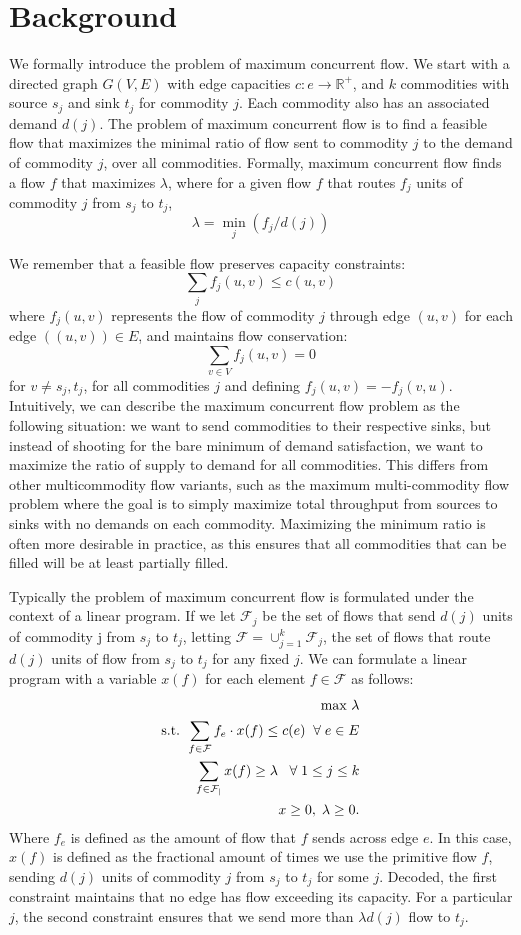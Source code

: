 \section{Background}
We formally introduce the problem of maximum concurrent flow. We
start with a directed graph $G(V,E)$ with edge capacities 
$c: e \rightarrow \mathbb{R}^+$,
 and $k$ commodities with source $s_j$ and sink $t_j$ for
commodity $j$. Each commodity also has an associated demand
$d(j)$. The problem of maximum concurrent flow is to find a feasible
flow that maximizes the minimal ratio of flow sent to commodity $j$ to the
demand of commodity $j$, over all commodities. Formally, maximum
concurrent flow finds a flow $f$ that maximizes $\lambda$, where for a given flow $f$ that routes $f_j$
units of commodity $j$ from $s_j$ to $t_j$, 
$$\lambda = \min_{j}(f_j/d(j))$$

We remember that a feasible flow preserves capacity constraints: 
$$\sum_j f_j(u,v) \leq c(u,v)$$
where $f_j(u,v)$ represents the flow of commodity $j$ through edge
$(u,v)$ for each edge $((u,v))\in E$, and maintains flow conservation:
$$\sum_{v\in V} f_j(u,v)=0$$ 
for $v\neq s_j,t_j$, for all commodities $j$ and defining
$f_j(u,v)=-f_j(v,u)$. Intuitively, we can describe the maximum
concurrent flow problem as the following situation: we want to send
commodities to their respective sinks, but instead of shooting for the
bare minimum of demand satisfaction, we want to maximize the ratio of
supply to demand for all commodities. This differs from other
multicommodity flow variants, such as the maximum multi-commodity flow
problem where the goal is to simply maximize total throughput from
sources to sinks with no demands on each commodity. Maximizing the minimum ratio is often more desirable in practice,
as this ensures that all commodities that can be filled will be at least partially filled.

Typically the problem of maximum concurrent flow is formulated under the context of a linear
program. If we let $\mathcal{F}_j$ be the set of flows that send $d(j)$ units
of commodity j from $s_j$ to $t_j$, letting
 $\mathcal{F}=\cup_{j=1}^k \mathcal{F}_j$, the set of flows that route
$d(j)$ units of flow from $s_j$ to $t_j$ for any fixed $j$. We can
formulate a linear program with a variable $x(f)$ for each element
$f\in \mathcal{F}$ as follows:
\begin{align*}
\text{max     } \lambda \\
\text{s.t. }\sum_{f\in \cal{F}}f_e\cdot x(f) \leq c(e) \;\;\forall\;
e\in E \\
\sum_{f\in \cal{F}_j} x(f)\geq \lambda \;\;\;\forall\; 1\leq j\leq k \\
x\geq 0,\; \lambda\geq 0.
\end{align*}
Where $f_e$ is defined as the amount of flow that $f$ sends across edge $e$. In this case, $x(f)$ is defined as the fractional amount of times we use the
primitive flow $f$, sending $d(j)$ units of commodity $j$ from $s_j$
to $t_j$ for some $j$. Decoded, the first constraint maintains that no
edge has flow exceeding its capacity. For a particular $j$, the second
constraint ensures that we send more than $\lambda d(j)$ flow to
$t_j$. 

